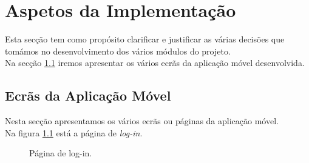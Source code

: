 \chapter{Aspetos da Implementação} \label{cap:implementacao}
Esta secção tem como propósito clarificar e justificar as várias decisões que tomámos no desenvolvimento dos vários módulos do projeto. \\
Na secção \ref{sec:ecra} iremos apresentar os vários ecrãs da aplicação móvel desenvolvida.

\section{Ecrãs da Aplicação Móvel} \label{sec:ecra}
Nesta secção apresentamos os vários ecrãs ou páginas da aplicação móvel.\\
Na figura \ref{fig:1} está a página de \textit{log-in}.

\begin{figure}[ht!]
\centering
{}
\caption{Página de log-in.}
\label{fig:1}
\end{figure}

